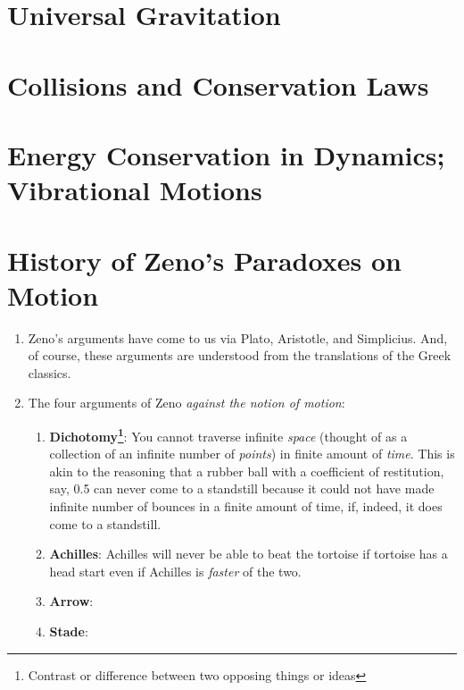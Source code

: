 \documentclass[12pt,a4paper]{book}
\begin{document}
\chapter{Universal Gravitation}\label{ch: 8-universal-gravitation}
\chapter{Collisions and Conservation Laws} \label{ch: 9-collisions}
\chapter[Energy Conservation in Dynamics]{Energy Conservation in Dynamics; Vibrational Motions}\label{ch: 10-energy-conservation}








\appendix
\chapter{History of Zeno's Paradoxes on Motion}
\label{zeno}
\begin{enumerate}
    \item Zeno's arguments have come to us via Plato, Aristotle, and Simplicius. And, of course, these arguments are understood from the translations of the Greek classics.
    \item The four arguments of Zeno \emph{against the notion of motion}:
        \begin{enumerate}
            \item \textbf{Dichotomy\footnote{Contrast or difference between two opposing things or ideas}}: You cannot traverse infinite \emph{space} (thought of as a collection of an infinite number of \emph{points}) in finite amount of \emph{time}. This is akin to the reasoning that a rubber ball with a coefficient of restitution, say, 0.5 can never come to a standstill because it could not have made infinite number of bounces in a finite amount of time, if, indeed, it does come to a standstill.
            \item \textbf{Achilles}: Achilles will never be able to beat the tortoise if tortoise has a head start even if Achilles is \emph{faster} of the two.
            \item \textbf{Arrow}:
            \item \textbf{Stade}:
        \end{enumerate}
\end{enumerate}
\end{document}
